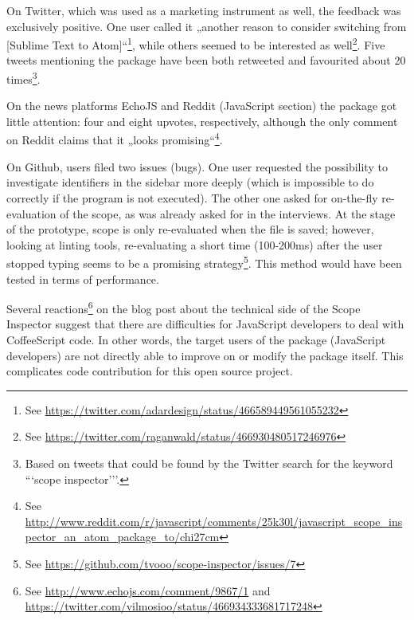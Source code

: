 On Twitter, which was used as a marketing instrument as well, the
feedback was exclusively positive. One user called it „another reason to
consider switching from {[}Sublime Text to
Atom{]}“\footnote{See \url{https://twitter.com/adardesign/status/466589449561055232}},
while others seemed to be interested as
well\footnote{See \url{https://twitter.com/raganwald/status/466930480517246976}}.
Five tweets mentioning the package have been both retweeted and
favourited about 20
times\footnote{Based on tweets that could be found by the Twitter search for the keyword ```scope inspector’’’.}.

On the news platforms EchoJS and Reddit (JavaScript section) the package
got little attention: four and eight upvotes, respectively, although the
only comment on Reddit claims that it „looks
promising“\footnote{See \url{http://www.reddit.com/r/javascript/comments/25k30l/javascript_scope_inspector_an_atom_package_to/chi27cm}}.

On Github, users filed two issues (bugs). One user requested the
possibility to investigate identifiers in the sidebar more deeply (which
is impossible to do correctly if the program is not executed). The other
one asked for on-the-fly re-evaluation of the scope, as was already
asked for in the interviews. At the stage of the prototype, scope is
only re-evaluated when the file is saved; however, looking at linting
tools, re-evaluating a short time (100-200ms) after the user stopped
typing seems to be a promising
strategy\footnote{See \url{https://github.com/tvooo/scope-inspector/issues/7}}.
This method would have been tested in terms of performance.

Several
reactions\footnote{See \url{http://www.echojs.com/comment/9867/1} and \url{https://twitter.com/vilmosioo/status/466934333681717248}}
on the blog post about the technical side of the Scope Inspector
\cite{tvo} suggest that there are difficulties for JavaScript developers
to deal with CoffeeScript code. In other words, the target users of the
package (JavaScript developers) are not directly able to improve on or
modify the package itself. This complicates code contribution for this
open source project.

